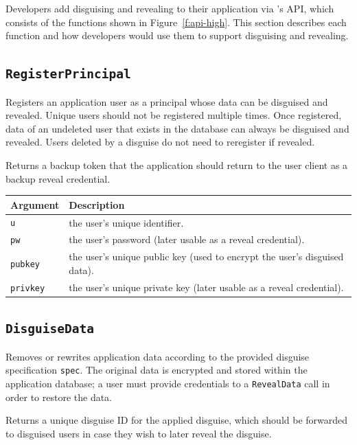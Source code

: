 Developers add disguising and revealing to their application via \sys's API,
which consists of the functions shown in Figure~\ref{f:api-high}. This section
describes each function and how developers would use them to support disguising
and revealing.

\subsection{\texttt{RegisterPrincipal}}
    Registers an application user as a principal whose data can be disguised and
    revealed. Unique users should not be registered multiple times. Once
    registered, data of an undeleted user that exists in the database can always
    be disguised and revealed.  Users deleted by a disguise do not need to
    reregister if revealed.

    Returns a backup token that the application should return to
    the user client as a backup reveal credential.

    \begin{center}
    \begin{longtable}{|m{}|m{}|}
        \hline
        \textbf{Argument} & \textbf{Description} \\
        \hline
        \texttt{u} & the user's unique identifier.\\
        \hline
        \texttt{pw} & the user's password (later usable as a reveal credential).\\
        \hline
        \texttt{pubkey} & the user's unique public key (used to encrypt the
        user's disguised data).\\
        \hline
        \texttt{privkey} & the user's unique private key (later usable as a reveal
        credential).\\
        \hline
    \end{longtable}
    \end{center}

\subsection{\texttt{DisguiseData}}
    Removes or rewrites application data according to
    the provided disguise specification \texttt{spec}. The original data
    is encrypted and stored within the application database; a user must provide
    credentials to a \texttt{RevealData} call in order to restore the data.

    Returns a unique disguise ID for the applied disguise, which should be
    forwarded to disguised users in case they wish to later reveal the
    disguise.


